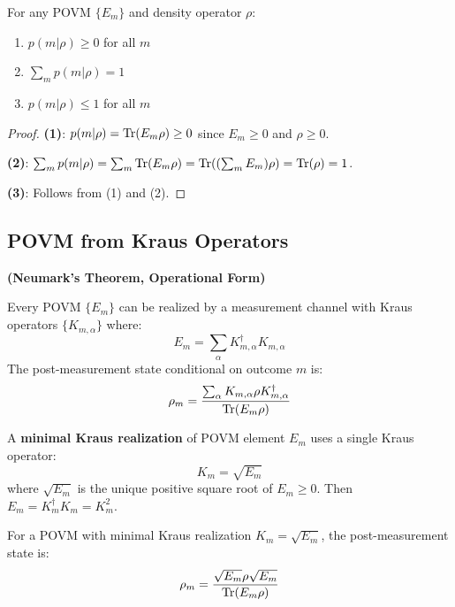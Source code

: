 \begin{proposition}
\label{prop:povm-probs}
For any POVM $\{E_m\}$ and density operator $\rho$:
\begin{enumerate}
  \item $p(m|\rho) \geq 0$ for all $m$
  \item $\sum_m p(m|\rho) = 1$
  \item $p(m|\rho) \leq 1$ for all $m$
\end{enumerate}
\end{proposition}

\begin{proof}
\textbf{(1)}: $p(m|\rho) = \mathrm{Tr}(E_m \rho) \geq 0$ since $E_m \geq 0$ and $\rho \geq 0$.

\textbf{(2)}: $\sum_m p(m|\rho) = \sum_m \mathrm{Tr}(E_m \rho) = \mathrm{Tr}((\sum_m E_m) \rho) = \mathrm{Tr}(\rho) = 1$.

\textbf{(3)}: Follows from (1) and (2).
\end{proof}

\subsection{POVM from Kraus Operators}

\begin{theorem}
\label{thm:kraus-povm}
\textbf{(Neumark's Theorem, Operational Form)}

Every POVM $\{E_m\}$ can be realized by a measurement channel with Kraus operators $\{K_{m,\alpha}\}$ where:
\[
E_m = \sum_\alpha K_{m,\alpha}^\dagger K_{m,\alpha}
\]
The post-measurement state conditional on outcome $m$ is:
\[
\rho_m = \frac{\sum_\alpha K_{m,\alpha} \rho K_{m,\alpha}^\dagger}{\mathrm{Tr}(E_m \rho)}
\]
\end{theorem}

\begin{definition}
\label{def:minimal-kraus}
A \textbf{minimal Kraus realization} of POVM element $E_m$ uses a single Kraus operator:
\[
K_m = \sqrt{E_m}
\]
where $\sqrt{E_m}$ is the unique positive square root of $E_m \geq 0$. Then $E_m = K_m^\dagger K_m = K_m^2$.
\end{definition}

\begin{corollary}
\label{cor:povm-update}
For a POVM with minimal Kraus realization $K_m = \sqrt{E_m}$, the post-measurement state is:
\[
\rho_m = \frac{\sqrt{E_m} \rho \sqrt{E_m}}{\mathrm{Tr}(E_m \rho)}
\]
\end{corollary}

